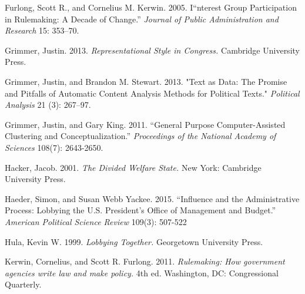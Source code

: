 Furlong, Scott R., and Cornelius M. Kerwin. 2005. I``nterest Group Participation in Rulemaking: A Decade of Change.'' \textit{Journal of Public Administration and Research} 15: 353–70.



Grimmer, Justin. 2013. \textit{Representational Style in Congress.} Cambridge University Press.

Grimmer, Justin, and Brandon M. Stewart. 2013. "Text as Data: The Promise and Pitfalls of Automatic Content Analysis Methods for Political Texts." \textit{Political Analysis} 21 (3): 267–97.

Grimmer, Justin, and Gary King. 2011. ``General Purpose Computer-Assisted Clustering and Conceptualization.'' \textit{Proceedings of the National Academy of Sciences} 108(7): 2643-2650.

Hacker, Jacob.  2001.  \textit{The Divided Welfare State.}  New York: Cambridge University Press.

Haeder, Simon, and Susan Webb Yackee. 2015. ``Influence and the Administrative Process: Lobbying the U.S. President's Office of Management and Budget.'' \textit{American Political Science Review} 109(3): 507-522


Hula, Kevin W. 1999. \textit{Lobbying Together.} Georgetown University Press. 




Kerwin, Cornelius, and Scott R. Furlong. 2011. \textit{Rulemaking: How government agencies write law and make policy.} 4th ed. Washington, DC: Congressional Quarterly.

